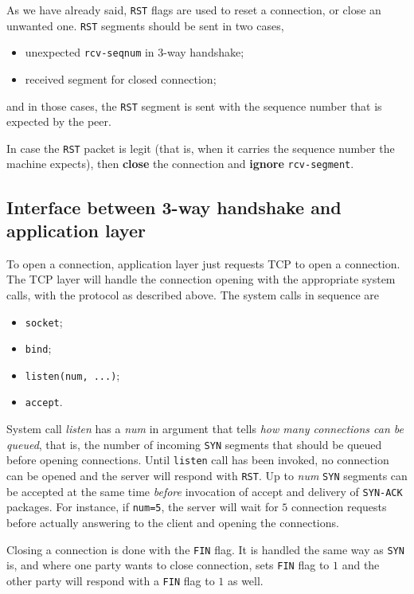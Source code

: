 \documentclass[10pt]{\classname}
\begin{document}
As we have already said, \texttt{RST} flags are used to reset a connection, or
close an unwanted one. \texttt{RST} segments should be sent in two cases,
\begin{itemize}
    \item unexpected \texttt{rcv-seqnum} in 3-way handshake;
    \item received segment for closed connection;
\end{itemize}
and in those cases, the \texttt{RST} segment is sent with the sequence number that is
expected by the peer.

In case the \texttt{RST} packet is legit (that is, when it carries the sequence number
the machine expects), then \textbf{close} the connection and \textbf{ignore}
\texttt{rcv-segment}.

\subsection{Interface between 3-way handshake and application layer}

To open a connection, application layer just requests TCP to open a connection.
The TCP layer will handle the connection opening with the appropriate system
calls, with the protocol as described above.
The system calls in sequence are

\begin{itemize}
	\item \texttt{socket};
    \item \texttt{bind};
    \item \texttt{listen(num, ...)};
    \item \texttt{accept}.
\end{itemize}

System call \emph{listen} has a \emph{num} in argument that tells \emph{how many
connections can be queued}, that is, the number of incoming \texttt{SYN} segments that
should be queued before opening connections. Until \texttt{listen} call has
been invoked, no connection can be opened and the server will respond with
\texttt{RST}. Up to \emph{num} \texttt{SYN} segments can be accepted at the
same time \emph{before} invocation of accept and delivery of \texttt{SYN-ACK}
packages. For instance, if \texttt{num=5}, the server will wait for $5$
connection requests before actually answering to the client and opening the
connections.

Closing a connection is done with the \texttt{FIN} flag. It is handled the same
way as \texttt{SYN} is, and where one party wants to close connection, sets
\texttt{FIN} flag to $1$ and the other party will respond with a \texttt{FIN}
flag to $1$ as well.
\end{document}

